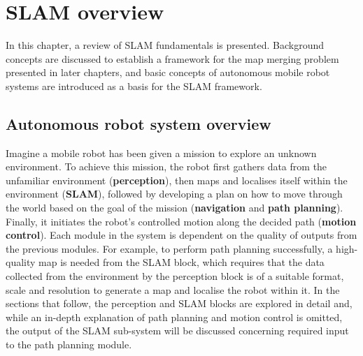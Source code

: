 \chapter{SLAM overview}
\label{ch:ch2}
In this chapter, a review of SLAM fundamentals is presented. Background concepts are discussed to establish a framework for the map merging problem presented in later chapters, and basic concepts of autonomous mobile robot systems are introduced as a basis for the SLAM framework.
\section{Autonomous robot system overview}
\label{section:ARSO}
Imagine a mobile robot has been given a mission to explore an unknown environment. To achieve this mission, the robot first gathers data from the unfamiliar environment (\textbf{perception}), then maps and localises itself within the environment (\textbf{SLAM}), followed by developing a plan on how to move through the world based on the goal of the mission (\textbf{navigation} and \textbf{path planning}). Finally, it initiates the robot's controlled motion along the decided path (\textbf{motion control}). Each module in the system is dependent on the quality of outputs from the previous modules. For example, to perform path planning successfully, a high-quality map is needed from the SLAM block, which requires that the data collected from the environment by the perception block is of a suitable format, scale and resolution to generate a map and localise the robot within it. In the sections that follow, the perception and SLAM blocks are explored in detail and, while an in-depth explanation of path planning and motion control is omitted, the output of the SLAM sub-system will be discussed concerning required input to the path planning module.

